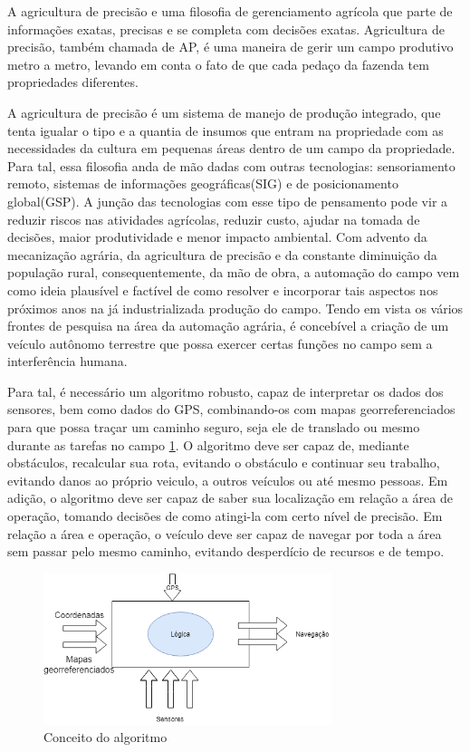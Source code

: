 A agricultura de precisão e uma filosofia de gerenciamento agrícola que parte de informações exatas, precisas e se completa com decisões exatas. Agricultura de precisão, também chamada de AP, é uma maneira de gerir um campo produtivo metro a metro, levando em conta o fato de que cada pedaço da fazenda tem propriedades diferentes.\cite{Tschiedel2002}

A agricultura de precisão é um sistema de manejo de produção integrado, que tenta igualar o tipo e a quantia de insumos que entram na propriedade com as necessidades da cultura em pequenas áreas dentro de um campo da propriedade. Para tal, essa filosofia anda de mão dadas com outras tecnologias: sensoriamento remoto, sistemas de informações geográficas(SIG) e de posicionamento global(GSP). A junção das tecnologias com esse tipo de pensamento pode vir a reduzir riscos nas atividades agrícolas, reduzir custo, ajudar na tomada de decisões, maior produtividade e menor impacto ambiental.
Com advento da mecanização agrária, da agricultura de precisão e da constante diminuição da população rural, consequentemente, da mão de obra, a automação do campo vem como ideia plausível e factível de como resolver e incorporar tais aspectos nos próximos anos na já industrializada produção do campo. Tendo em vista os vários frontes de pesquisa na área da automação agrária, é concebível a criação de um veículo autônomo terrestre que possa exercer certas funções no campo sem a interferência humana. 

Para tal, é necessário um algoritmo robusto, capaz de interpretar os dados dos sensores, bem como dados do GPS, combinando-os com mapas georreferenciados para que possa traçar um caminho seguro, seja ele de translado ou mesmo durante as tarefas no campo \ref{fig:entrada:saida}. O algoritmo deve ser capaz de, mediante obstáculos, recalcular sua rota, evitando o obstáculo e continuar seu trabalho, evitando danos ao próprio veiculo, a outros veículos ou até mesmo pessoas. Em adição, o algoritmo deve ser capaz de saber sua localização em relação a área de operação, tomando decisões de como atingi-la com certo nível de precisão. Em relação a área e operação, o veículo deve ser capaz de navegar por toda a área sem passar pelo mesmo caminho, evitando desperdício de recursos e de tempo.

\begin{figure}[H]
    \centering
    \includegraphics[width=0.75\textwidth]{figuras/entradaSaida.png}
    \caption{Conceito do algoritmo}
    \label{fig:entrada:saida}
\end{figure}

